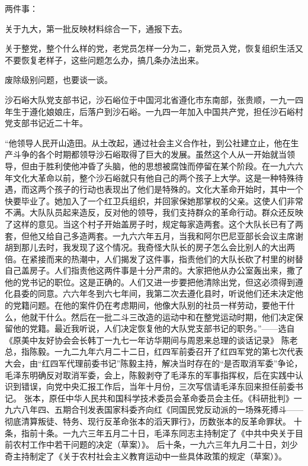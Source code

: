 两件事：

关于九大，第一批反映材料综合一下，通报下去。

关于整党，整个什么样的党，老党员怎样一分为二，新党员入党，恢复组织生活又不要恢复老样子，这些问题怎么办，搞几条办法出来。

废除级别问题，也要谈一谈。

\begin{maonote}
沙石峪大队党支部书记，沙石峪位于中国河北省遵化市东南部，张贵顺，一九一四年生于遵化娘娘庄，后落户到沙石峪。一九四一年加入中国共产党，担任沙石峪村党支部书记近二十年。

“他领导人民开山造田。从土改起，通过社会主义合作社，到公社建立止，他在生产斗争的各个时期都领导沙石峪取得了巨大的发展。虽然这个人从一开始就当领导，但由于胜利使他冲昏了头脑，他的思想被腐蚀而停留在某个阶段。在一九六六年文化大革命以前，整个沙石峪就只有他自己的两个孩子上大学。这是一种特殊待遇，而这两个孩子的行动也表现出了他们是特殊的。文化大革命开始时，其中一个快要毕业了。她加入了一个红卫兵组织，并回家保她那掌权的父亲。这使人们非常不满。大队队员起来造反，反对他的领导，我们支持群众的革命行动。群众还反映了这样的意见。当这个村子开始盖房子时，规定每家造两套。这个大队长已有了两套，但他又给自己多造两套。一九六六年五月，当我和阿尔巴尼亚部长会议主席谢胡到那儿去时，我发现了这个情况。我奇怪大队长的房子怎么会比别人的大出两倍。在紧接而来的热潮中，人们揭发了这件事，指责他们的大队长砍了村里的树替自己盖房子。人们指责他这两件事是十分严肃的。大家把他从办公室轰出来，撒了他的党书记的职位。这是正确的。人们又进一步要把他清除出党，但这必须得到遵化县委的同意。六六年冬到六七年间，我第二次去遵化县时，听说他们还未决定他的党籍问题。在他的案件仍在考虑期间，他像大队别的社员一样劳动，要他干什么，他就干什么。然后在一批二斗三改造的运动中和在整党运动时期，他们决定保留他的党籍。最近我听说，人们决定恢复他的大队党支部书记的职务。”——选自《原美中友好协会会长韩丁一九七一年访华期间与周恩来总理的谈话记录》
陈老总，指陈毅。一九二九年六月二十二日，红四军前委召开了红四军党的第七次代表大会，由“红四军代理前委书记”陈毅主持，解决当时存在的“是否取消军委”争论，毛泽东明确反对取消军委，会上，陈毅剥夺了毛泽东的军事指挥权，后在实践中认识到错误，向党中央汇报工作后，当年十月份，三次写信请毛泽东回来担任前委书记。
张本，原任中华人民共和国科学技术委员会革命委员会主任。《科研批判》一九六八年四、五期合刊发表国家科委齐向红《同国民党反动派的一场殊死搏斗——彻底清算叛徒、特务、现行反革命张本的滔天罪行》，历数张本的反革命罪状。
十条，指前十条。一九六三年五月二十日，毛泽东同志主持制定了《中共中央关于目前农村工作中若干问题的决定（草案）》。
后十条，一九六三年九月二十日，刘少奇主持制定了《关于农村社会主义教育运动中一些具体政策的规定（草案）》。
\end{maonote}
